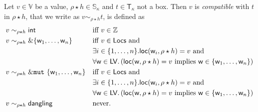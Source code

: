 \begin{definition}\label{def:value_compatibility}
  Let $v\in\mathbb{V}$ be a value, $\rho\star h\in\mathbb{S}_\kappa$ and
  $t\in\mathsf{T}_\kappa$ not a box. Then $v$ is \emph{compatible} with $t$ in $\rho\star h$,
  that we write as $v\sim_{\rho\star h}t$, is defined as
  \begin{align*}
    v&\sim_{\rho\star h}\mathsf{int} && \text{iff $v\in\mathbb{Z}$}\\
    v&\sim_{\rho\star h}\&\{\mathsf{w}_1,\ldots,\mathsf{w}_n\} && \text{iff $v\in\mathsf{Locs}$ and}\\
    &&& \exists i\in\{1,\ldots,n\}.\mathsf{loc}(\mathsf{w}_i,\rho\star h)=v\text{ and}\\
    &&& \forall\mathsf{w}\in\mathsf{LV}.\left(\mathsf{loc}(\mathsf{w},\rho\star h)=v\text{ implies }\mathsf{w}\in\{\mathsf{w}_1,\ldots,\mathsf{w}_n\}\right)\\
    v&\sim_{\rho\star h}\&\mathtt{mut}\ \{\mathsf{w}_1,\ldots,\mathsf{w}_n\} && \text{iff $v\in\mathsf{Locs}$ and}\\
    &&& \exists i\in\{1,\ldots,n\}.\mathsf{loc}(\mathsf{w}_i,\rho\star h)=v\text{ and}\\
    &&& \forall\mathsf{w}\in\mathsf{LV}.\left(\mathsf{loc}(\mathsf{w},\rho\star h)=v\text{ implies }\mathsf{w}\in\{\mathsf{w}_1,\ldots,\mathsf{w}_n\}\right)\\
    v&\sim_{\rho\star h}\mathsf{dangling} && \text{never.}
  \end{align*}
\end{definition}

